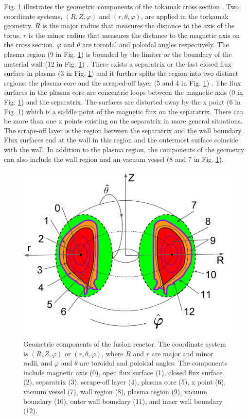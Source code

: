 \documentclass[11pt]{article}  %
\begin{document}
Fig. \ref{fig:geo} illustrates the geometric components of the tokamak cross section \cite{wesson2011tokamaks,stacey1982fusion}.  Two coordinate systems,  $(R,Z,\varphi)$ and $(r,\theta, \varphi)$, are  applied in the torkamak geometry. $R$ is the major radius that measures the distance to the axis of the torus. $r$ is the minor radius that measures the distance to the magnetic axis on the cross section. $\varphi$ and $\theta$ are toroidal and poloidal angles respectively. 
The plasma region (9 in Fig. \ref{fig:geo}) is bounded by the limiter or the boundary of the material wall (12 in Fig. \ref{fig:geo}) \cite{wesson2011tokamaks}. There exists a separatrix or the last closed flux surface in plasma (3 in Fig. \ref{fig:geo}) and  it further splits the region into two distinct regions: the plasma core and the scraped-off layer (5 and 4 in Fig. \ref{fig:geo}) \cite{wesson2011tokamaks}. The flux surfaces in the plasma core are concentric loops between the magnetic axis (0 in Fig. \ref{fig:geo}) and the separatrix. The surfaces are distorted away by the x point (6 in Fig. \ref{fig:geo}) which is a saddle point of the magnetic flux on the separatrix.  There can be more than one x points existing on the separatrix in more general situations. The scrape-off layer is the region between the separatrix and the wall boundary. Flux surfaces end at the wall in this region and the outermost surface coincide with the wall.  In addition to the plasma region, the components of the geometry can also include the wall region and an vacuum vessel (8 and 7 in Fig. \ref{fig:geo}).  

\begin{figure}[htb]
\center
\includegraphics[width=\textwidth]{fig/fusiongeo3d.png}
\caption{Geometric components of the fusion reactor. The coordinate system is $(R,Z, \varphi)$ or $(r,\theta, \varphi)$, where $R$ and $r$ are major and minor radii, and $\varphi$ and $\theta$ are toroidal and poloidal angles. The components include magnetic axis (0), open flux surface (1), closed flux surface (2),  separatrix (3), scrape-off layer (4), plasma core (5), x point (6), vacuum vessel (7), wall region (8),  plasma region (9), vacuum boundary (10), outer wall boundary (11), and inner wall boundary (12).} \label{fig:geo}
\end{figure}
\end{document}
